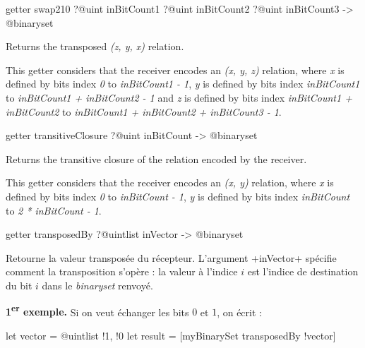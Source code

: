 
\begin{galgas3box}
getter swap210
  ?@uint inBitCount1
  ?@uint inBitCount2
  ?@uint inBitCount3
  -> @binaryset
\end{galgas3box}

Returns the transposed \emph{(z, y, x)} relation.

This getter considers that the receiver encodes an \emph{(x, y, z)} relation, where \emph{x} is defined by bits index \emph{0} to \emph{inBitCount1  - 1}, \emph{y} is defined by bits index \emph{inBitCount1} to \emph{inBitCount1 + inBitCount2 - 1} and  \emph{z} is defined by bits index \emph{inBitCount1 + inBitCount2} to \emph{inBitCount1 + inBitCount2 + inBitCount3 - 1}.









\begin{galgas3box}
getter transitiveClosure ?@uint inBitCount -> @binaryset
\end{galgas3box}


Returns the transitive closure of the relation encoded by the receiver.

This getter considers that the receiver encodes an \emph{(x, y)} relation, where \emph{x} is defined by bits index \emph{0} to \emph{inBitCount  - 1}, \emph{y} is defined by bits index \emph{inBitCount} to \emph{2 * inBitCount - 1}.







\begin{galgas3box}
getter transposedBy ?@uintlist inVector -> @binaryset
\end{galgas3box}

Retourne la valeur transposée du récepteur. L'argument \ggst+inVector+ spécifie comment la transposition s'opère : la valeur à l'indice $i$ est l'indice de destination du bit $i$ dans le \emph{binaryset} renvoyé.

{\bf 1\textsuperscript{er} exemple.} Si on veut échanger les bits $0$ et $1$, on écrit :
\begin{galgas3}
let vector = @uintlist {!1, !0}
let result = [myBinarySet transposedBy !vector]
\end{galgas3}

